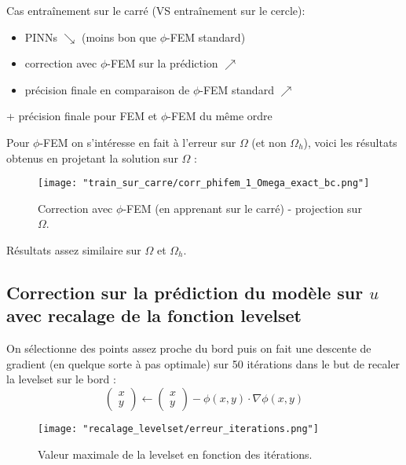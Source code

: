 \begin{Obs}
	Cas entraînement sur le carré (VS entraînement sur le cercle):
	\begin{itemize}
		\item PINNs $\searrow$ (moins bon que $\phi$-FEM standard)
		\item correction avec $\phi$-FEM sur la prédiction $\nearrow$
		\item précision finale en comparaison de $\phi$-FEM standard $\nearrow$
	\end{itemize}
	+ précision finale pour FEM et $\phi$-FEM du même ordre
\end{Obs}

Pour $\phi$-FEM on s'intéresse en fait à l'erreur sur $\Omega$ (et non $\Omega_h$), voici les résultats obtenus en projetant la solution sur $\Omega$ :

\begin{figure}[H]
	\centering
	\texttt{[image: "train\_sur\_carre/corr\_phifem\_1\_Omega\_exact\_bc.png"]}
	\caption{Correction avec $\phi$-FEM (en apprenant sur le carré) - projection sur $\Omega$.}
\end{figure}

\begin{Obs}
	Résultats assez similaire sur $\Omega$ et $\Omega_h$.
\end{Obs}

\newpage

\subsection{Correction sur la prédiction du modèle sur $u$ avec recalage de la fonction levelset}

\begin{minipage}{0.58\linewidth}
	On sélectionne des points assez proche du bord puis on fait une descente de gradient (en quelque sorte à pas optimale) sur 50 itérations dans le but de recaler la levelset sur le bord :
	\begin{equation*}
		\begin{pmatrix}
			x \\
			y
		\end{pmatrix}\leftarrow\begin{pmatrix}
			x \\
			y
		\end{pmatrix}-\phi(x,y)\cdot\nabla\phi(x,y)
	\end{equation*}
\end{minipage}
\begin{minipage}{0.38\linewidth}
	\begin{figure}[H]
		\centering
		\texttt{[image: "recalage\_levelset/erreur\_iterations.png"]}
		\caption{Valeur maximale de la levelset en fonction des itérations.}
	\end{figure}
\end{minipage}



